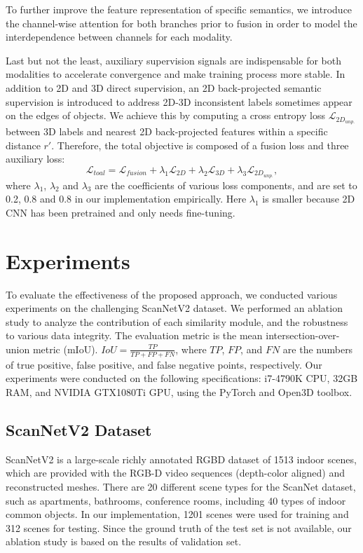 \documentclass[letterpaper, 10 pt, conference]{ieeeconf}
\begin{document}
To further improve the feature representation of specific semantics, we introduce the channel-wise attention \cite{fu2019dual} for both branches prior to fusion in order to model the interdependence between channels for each modality. 

Last but not the least, auxiliary supervision signals are indispensable for both modalities to accelerate convergence and make training process more stable. In addition to 2D and 3D direct supervision, an 2D back-projected semantic supervision is introduced to address 2D-3D inconsistent labels sometimes appear on the edges of objects. We achieve this by computing a cross entropy loss $\mathcal{L}_{2D_{unp.}}$ between 3D labels and nearest 2D back-projected features within a specific distance $r'$. Therefore, the total objective is composed of a fusion loss and three auxiliary loss:
\begin{equation}
\mathcal{L}_{toal} = \mathcal{L}_{fusion} + \lambda_1 \mathcal{L}_{2D} + \lambda_2 \mathcal{L}_{3D} + \lambda_3 \mathcal{L}_{2D_{unp.}},
\end{equation}
where $\lambda_1$, $\lambda_2$ and $\lambda_3$ are the coefficients of various loss components, and are set to 0.2, 0.8 and 0.8 in our implementation empirically. Here $\lambda_1$ is smaller because 2D CNN has been pretrained and only needs fine-tuning.



\section{Experiments}
To evaluate the effectiveness of the proposed approach, we conducted various experiments on the challenging ScanNetV2 dataset\cite{dai2017scannet}. We performed an ablation study to analyze the contribution of each similarity module, and the robustness to various data integrity. The evaluation metric is the mean intersection-over-union metric (mIoU). $IoU = \frac{TP}{TP+FP+FN}$, where $TP$, $FP$, and $FN$ are the numbers of true positive, false positive, and false negative points, respectively. Our experiments were conducted on the following specifications:
i7-4790K CPU, 32GB RAM, and NVIDIA GTX1080Ti GPU, using the PyTorch and Open3D \cite{Zhou2018} toolbox.




\subsection{ScanNetV2 Dataset}
ScanNetV2 is a large-scale richly annotated RGBD dataset of 1513 indoor scenes, which are provided with the RGB-D video sequences (depth-color aligned) and reconstructed meshes. There are 20 different scene types for the ScanNet dataset, such as apartments, bathrooms, conference rooms, including 40 types of indoor common objects. In our implementation, 1201 scenes were used for training and 312 scenes for testing. Since the ground truth of the test set is not available, our ablation study is based on the results of validation set.
\end{document}
